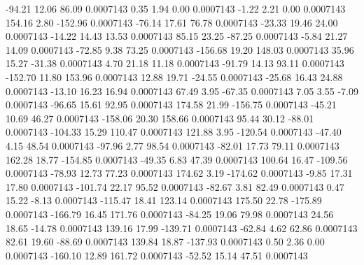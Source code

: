       -94.21       12.06       86.09     0.0007143
        0.35        1.94        0.00     0.0007143
       -1.22        2.21        0.00     0.0007143
      154.16        2.80     -152.96     0.0007143
      -76.14       17.61       76.78     0.0007143
      -23.33       19.46       24.00     0.0007143
      -14.22       14.43       13.53     0.0007143
       85.15       23.25      -87.25     0.0007143
       -5.84       21.27       14.09     0.0007143
      -72.85        9.38       73.25     0.0007143
     -156.68       19.20      148.03     0.0007143
       35.96       15.27      -31.38     0.0007143
        4.70       21.18       11.18     0.0007143
      -91.79       14.13       93.11     0.0007143
     -152.70       11.80      153.96     0.0007143
       12.88       19.71      -24.55     0.0007143
      -25.68       16.43       24.88     0.0007143
      -13.10       16.23       16.94     0.0007143
       67.49        3.95      -67.35     0.0007143
        7.05        3.55       -7.09     0.0007143
      -96.65       15.61       92.95     0.0007143
      174.58       21.99     -156.75     0.0007143
      -45.21       10.69       46.27     0.0007143
     -158.06       20.30      158.66     0.0007143
       95.44       30.12      -88.01     0.0007143
     -104.33       15.29      110.47     0.0007143
      121.88        3.95     -120.54     0.0007143
      -47.40        4.15       48.54     0.0007143
      -97.96        2.77       98.54     0.0007143
      -82.01       17.73       79.11     0.0007143
      162.28       18.77     -154.85     0.0007143
      -49.35        6.83       47.39     0.0007143
      100.64       16.47     -109.56     0.0007143
      -78.93       12.73       77.23     0.0007143
      174.62        3.19     -174.62     0.0007143
       -9.85       17.31       17.80     0.0007143
     -101.74       22.17       95.52     0.0007143
      -82.67        3.81       82.49     0.0007143
        0.47       15.22       -8.13     0.0007143
     -115.47       18.41      123.14     0.0007143
      175.50       22.78     -175.89     0.0007143
     -166.79       16.45      171.76     0.0007143
      -84.25       19.06       79.98     0.0007143
       24.56       18.65      -14.78     0.0007143
      139.16       17.99     -139.71     0.0007143
      -62.84        4.62       62.86     0.0007143
       82.61       19.60      -88.69     0.0007143
      139.84       18.87     -137.93     0.0007143
        0.50        2.36        0.00     0.0007143
     -160.10       12.89      161.72     0.0007143
      -52.52       15.14       47.51     0.0007143
